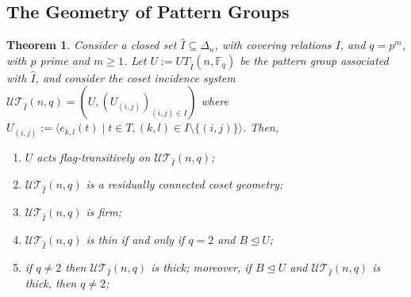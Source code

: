 \documentclass[11pt,letterpaper]{amsart}
\newtheorem{theorem}{Theorem}[section]
\newcommand{\TT}{\mathcal{T}}
\newcommand{\FF}{\mathbb{F}}
\newcommand{\UU}{\mathcal{U}}
\begin{document}
\subsection{The Geometry of Pattern Groups}
 \begin{theorem}\label{thm:CG_of_Pattern}
    Consider a closed set $\widehat{I}\subseteq \Delta_n$, with covering relations $I$, and $q=p^m$, with $p$ prime and $m\geq 1$.
    Let $U:=UT_{\widehat{I}}(n,\FF_q)$ be the pattern group associated with $\widehat{I}$, and consider the coset incidence system $\UU\TT_{\widehat{I}}(n,q)=(U,(U_{(i,j)})_{(i,j)\in I})$ where $U_{(i,j)} := \langle e_{k,l}(t) \mid t\in T, (k,l)\in I\setminus\{(i,j)\} \rangle$. Then,
    \begin{enumerate}
        \item $U$ acts flag-transitively on $\UU\TT_{\widehat{I}}(n,q)$;
        \item $\UU\TT_{\widehat{I}}(n,q)$ is a residually connected coset geometry;
        \item $\UU\TT_{\widehat{I}}(n,q)$ is firm;
        \item $\UU\TT_{\widehat{I}}(n,q)$ is thin if and only if $q=2$ and $B\trianglelefteq U$;
        \item if $q\neq 2$ then $\UU\TT_{\widehat{I}}(n,q)$ is thick; moreover, if $B\trianglelefteq U$ and $\UU\TT_{\widehat{I}}(n,q)$ is thick, then $q\neq 2$;
        
    \end{enumerate}
\end{theorem}
\end{document}
